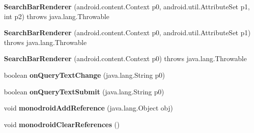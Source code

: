 \begin{DoxyCompactItemize}
\item 
\mbox{\label{classmd5b60ffeb829f638581ab2bb9b1a7f4f3f_1_1_search_bar_renderer_a0c52f1938dc18326653f3a5413d92428}} 
{\bfseries Search\+Bar\+Renderer} (android.\+content.\+Context p0, android.\+util.\+Attribute\+Set p1, int p2)  throws java.\+lang.\+Throwable 	
\item 
\mbox{\label{classmd5b60ffeb829f638581ab2bb9b1a7f4f3f_1_1_search_bar_renderer_a878e0ca2cd8969a1c594bb1dae952c3a}} 
{\bfseries Search\+Bar\+Renderer} (android.\+content.\+Context p0, android.\+util.\+Attribute\+Set p1)  throws java.\+lang.\+Throwable 	
\item 
\mbox{\label{classmd5b60ffeb829f638581ab2bb9b1a7f4f3f_1_1_search_bar_renderer_a7c99ebcffaa2c273a4adbc8e4fc8281a}} 
{\bfseries Search\+Bar\+Renderer} (android.\+content.\+Context p0)  throws java.\+lang.\+Throwable 	
\item 
\mbox{\label{classmd5b60ffeb829f638581ab2bb9b1a7f4f3f_1_1_search_bar_renderer_a53f7d71599559efcc390efdec95a3527}} 
boolean {\bfseries on\+Query\+Text\+Change} (java.\+lang.\+String p0)
\item 
\mbox{\label{classmd5b60ffeb829f638581ab2bb9b1a7f4f3f_1_1_search_bar_renderer_a69d8a7b933f0c7ac02d7d945868f8037}} 
boolean {\bfseries on\+Query\+Text\+Submit} (java.\+lang.\+String p0)
\item 
\mbox{\label{classmd5b60ffeb829f638581ab2bb9b1a7f4f3f_1_1_search_bar_renderer_a9b7a0243add9b3f0e1e1e2e9883f69c6}} 
void {\bfseries monodroid\+Add\+Reference} (java.\+lang.\+Object obj)
\item 
\mbox{\label{classmd5b60ffeb829f638581ab2bb9b1a7f4f3f_1_1_search_bar_renderer_a3c10c17f8a9cdc8b84310d45c845399a}} 
void {\bfseries monodroid\+Clear\+References} ()
\end{DoxyCompactItemize}
